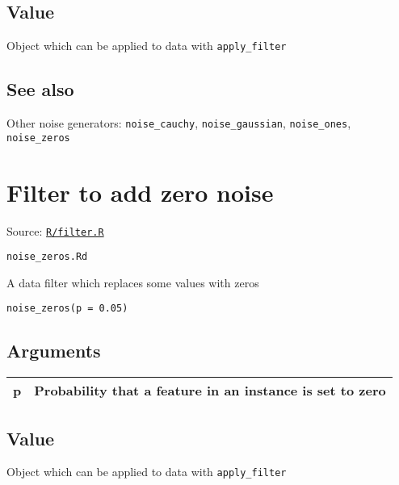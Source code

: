 \hypertarget{value}{\subsection{\texorpdfstring{\protect\hyperlink{value}{}Value}{Value}}\label{value}}

Object which can be applied to data with \texttt{apply\_filter}

\hypertarget{see-also}{\subsection{\texorpdfstring{\protect\hyperlink{see-also}{}See
also}{See also}}\label{see-also}}

Other noise generators: \texttt{noise\_cauchy},
\texttt{noise\_gaussian}, \texttt{noise\_ones}, \texttt{noise\_zeros}

\section{Filter to add zero noise}\label{filter-to-add-zero-noise}

Source:
\href{https://github.com/fdavidcl/ruta/blob/master/R/filter.R}{\texttt{R/filter.R}}

\texttt{noise\_zeros.Rd}

A data filter which replaces some values with zeros

\begin{verbatim}
noise_zeros(p = 0.05)
\end{verbatim}

\hypertarget{arguments}{\subsection{\texorpdfstring{\protect\hyperlink{arguments}{}Arguments}{Arguments}}\label{arguments}}

\begin{longtable}[c]{@{}ll@{}}
\toprule
p & Probability that a feature in an instance is set to
zero\tabularnewline
\bottomrule
\end{longtable}

\hypertarget{value}{\subsection{\texorpdfstring{\protect\hyperlink{value}{}Value}{Value}}\label{value}}

Object which can be applied to data with \texttt{apply\_filter}

